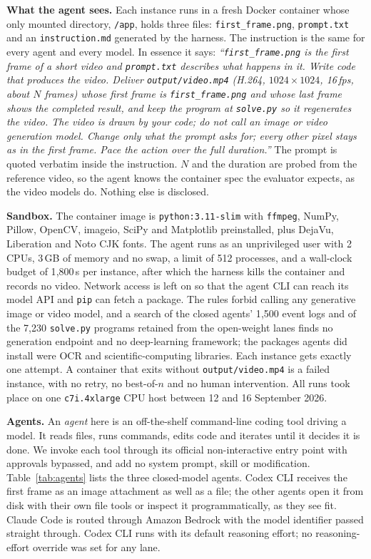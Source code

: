 \textbf{What the agent sees.} Each instance runs in a fresh Docker container whose only mounted directory, \texttt{/app}, holds three files: \texttt{first\_frame.png}, \texttt{prompt.txt} and an \texttt{instruction.md} generated by the harness. The instruction is the same for every agent and every model. In essence it says: \emph{``\texttt{first\_frame.png} is the first frame of a short video and \texttt{prompt.txt} describes what happens in it. Write code that produces the video. Deliver \texttt{output/video.mp4} (H.264, $1024\times1024$, 16\,fps, about $N$ frames) whose first frame is \texttt{first\_frame.png} and whose last frame shows the completed result, and keep the program at \texttt{solve.py} so it regenerates the video. The video is drawn by your code; do not call an image or video generation model. Change only what the prompt asks for; every other pixel stays as in the first frame. Pace the action over the full duration.''} The prompt is quoted verbatim inside the instruction. $N$ and the duration are probed from the reference video, so the agent knows the container spec the evaluator expects, as the video models do. Nothing else is disclosed.

\textbf{Sandbox.} The container image is \texttt{python:3.11-slim} with \texttt{ffmpeg}, NumPy, Pillow, OpenCV, imageio, SciPy and Matplotlib preinstalled, plus DejaVu, Liberation and Noto CJK fonts. The agent runs as an unprivileged user with 2 CPUs, 3\,GB of memory and no swap, a limit of 512 processes, and a wall-clock budget of 1{,}800\,s per instance, after which the harness kills the container and records no video. Network access is left on so that the agent CLI can reach its model API and \texttt{pip} can fetch a package. The rules forbid calling any generative image or video model, and a search of the closed agents' 1{,}500 event logs and of the 7{,}230 \texttt{solve.py} programs retained from the open-weight lanes finds no generation endpoint and no deep-learning framework; the packages agents did install were OCR and scientific-computing libraries. Each instance gets exactly one attempt. A container that exits without \texttt{output/video.mp4} is a failed instance, with no retry, no best-of-$n$ and no human intervention. All runs took place on one \texttt{c7i.4xlarge} CPU host between 12 and 16 September 2026.

\textbf{Agents.} An \emph{agent} here is an off-the-shelf command-line coding tool driving a model. It reads files, runs commands, edits code and iterates until it decides it is done. We invoke each tool through its official non-interactive entry point with approvals bypassed, and add no system prompt, skill or modification. Table~\ref{tab:agents} lists the three closed-model agents. Codex CLI receives the first frame as an image attachment as well as a file; the other agents open it from disk with their own file tools or inspect it programmatically, as they see fit. Claude Code is routed through Amazon Bedrock with the model identifier passed straight through. Codex CLI runs with its default reasoning effort; no reasoning-effort override was set for any lane.


